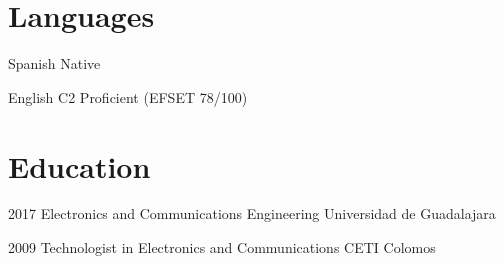 \documentclass{resume} %
\begin{document}


\section{Languages}


\langitem
    {Spanish}
    {Native}


\langitem
    {English}
    {C2 Proficient (EFSET 78/100)}




\section{Education}


\eduitem
    {2017}
    {Electronics and Communications Engineering}
    {Universidad de Guadalajara}


\eduitem
    {2009}
    {Technologist in Electronics and Communications}
    {CETI Colomos}


\end{document}
